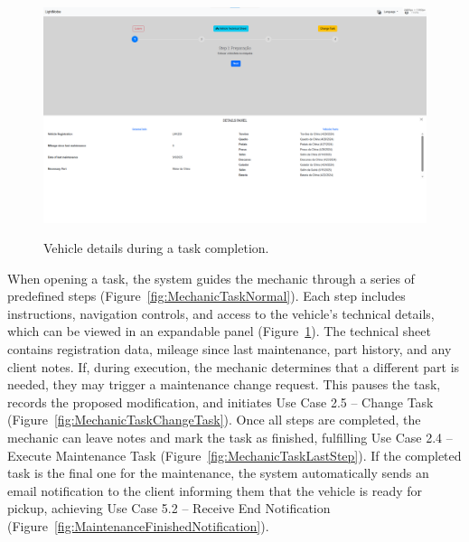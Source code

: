 \begin{figure}[h]
  \caption{Vehicle details during a task completion.}
  \centering
  \includegraphics[width=\textwidth]{figs/Implementation/mechanic/MechanicTaskVehicleDetails}
  \label{fig:MechanicTaskVehicleDetails}
\end{figure}



When opening a task, the system guides the mechanic through a series of predefined steps (Figure~\ref{fig:MechanicTaskNormal}). Each step includes instructions, navigation controls, and access to the vehicle's technical details, which can be viewed in an expandable panel (Figure~\ref{fig:MechanicTaskVehicleDetails}). The technical sheet contains registration data, mileage since last maintenance, part history, and any client notes. If, during execution, the mechanic determines that a different part is needed, they may trigger a maintenance change request. This pauses the task, records the proposed modification, and initiates Use Case 2.5 – Change Task (Figure~\ref{fig:MechanicTaskChangeTask}). Once all steps are completed, the mechanic can leave notes and mark the task as finished, fulfilling Use Case 2.4 – Execute Maintenance Task (Figure~\ref{fig:MechanicTaskLastStep}). If the completed task is the final one for the maintenance, the system automatically sends an email notification to the client informing them that the vehicle is ready for pickup, achieving Use Case 5.2 – Receive End Notification (Figure~\ref{fig:MaintenanceFinishedNotification}).




